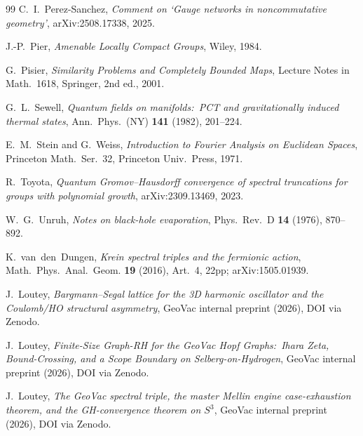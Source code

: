\documentclass[11pt,a4paper]{article}
\theoremstyle{plain}
\theoremstyle{definition}
\newcommand{\sthree}{S^{3}}
\begin{document}
\begin{thebibliography}{99}
C.~I.~Perez-Sanchez,
\newblock \emph{Comment on `Gauge networks in noncommutative geometry'},
\newblock arXiv:2508.17338, 2025.

J.-P.~Pier,
\newblock \emph{Amenable Locally Compact Groups},
\newblock Wiley, 1984.

G.~Pisier,
\newblock \emph{Similarity Problems and Completely Bounded Maps},
\newblock Lecture Notes in Math.~1618, Springer, 2nd ed., 2001.

G.~L.~Sewell,
\newblock \emph{Quantum fields on manifolds:\ PCT and gravitationally
induced thermal states},
\newblock Ann.~Phys.\ (NY) \textbf{141} (1982), 201--224.

E.~M.~Stein and G.~Weiss,
\newblock \emph{Introduction to Fourier Analysis on Euclidean
Spaces},
\newblock Princeton Math.~Ser.~32, Princeton Univ.~Press, 1971.

R.~Toyota,
\newblock \emph{Quantum Gromov--Hausdorff convergence of spectral
truncations for groups with polynomial growth},
\newblock arXiv:2309.13469, 2023.

W.~G.~Unruh,
\newblock \emph{Notes on black-hole evaporation},
\newblock Phys.~Rev.\ D \textbf{14} (1976), 870--892.

K.~van~den~Dungen,
\newblock \emph{Krein spectral triples and the fermionic action},
\newblock Math.~Phys.~Anal.~Geom. \textbf{19} (2016), Art.~4, 22pp;
\newblock arXiv:1505.01939.


J.~Loutey,
\newblock \emph{Bargmann--Segal lattice for the 3D harmonic
oscillator and the Coulomb/HO structural asymmetry},
\newblock GeoVac internal preprint (2026), DOI via Zenodo.

J.~Loutey,
\newblock \emph{Finite-Size Graph-RH for the GeoVac Hopf Graphs:\ Ihara
Zeta, Bound-Crossing, and a Scope Boundary on Selberg-on-Hydrogen},
\newblock GeoVac internal preprint (2026), DOI via Zenodo.

J.~Loutey,
\newblock \emph{The GeoVac spectral triple, the master Mellin engine
case-exhaustion theorem, and the GH-convergence theorem on
$\sthree$},
\newblock GeoVac internal preprint (2026), DOI via Zenodo.


\end{thebibliography}
\end{document}
